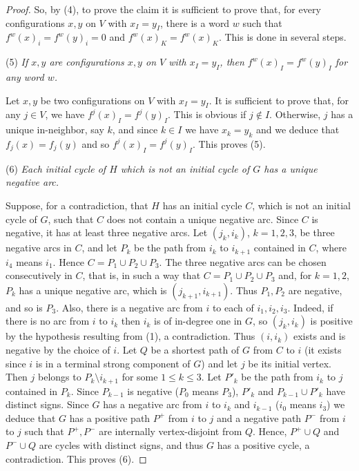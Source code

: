 \documentclass[11pt,letter]{article}
\begin{document}
\begin{proof}
\bigskip
So, by (4), to prove the claim it is sufficient to prove that, for every configurations $x,y$ on $V$ with $x_I=y_I$, there is a word $w$ such that $f^w(x)_i=f^w(y)_i=0$ and $f^w(x)_K=f^w(x)_K$. This is done in several steps. 

\bigskip
\noindent
(5) {\em If $x,y$ are configurations $x,y$ on $V$ with $x_I=y_I$, then $f^w(x)_I=f^w(y)_I$ for any word $w$.}

\medskip
\noindent
Let $x,y$ be two configurations on $V$ with $x_I=y_I$. It is sufficient to prove that, for any $j\in V$, we have $f^j(x)_I=f^j(y)_I$. This is obvious if $j\not\in I$. Otherwise, $j$ has a unique in-neighbor, say $k$, and since $k\in I$ we have $x_k=y_k$ and we deduce that $f_j(x)=f_j(y)$ and so $f^j(x)_I=f^j(y)_I$. This proves (5). 

\bigskip
\noindent
(6) {\em Each initial cycle of $H$ which is not an initial cycle of $G$ has a unique negative arc.}

\medskip
\noindent
Suppose, for a contradiction, that $H$ has an initial cycle $C$, which is not an initial cycle of $G$, such that $C$ does not contain a unique negative arc. Since $C$ is negative, it has at least three negative arcs. Let $(j_k,i_k)$, $k=1,2,3$, be three negative arcs in $C$, and let $P_k$ be the path from $i_k$ to $i_{k+1}$ contained in $C$, where $i_4$ means $i_1$. Hence $C=P_1\cup P_2\cup P_3$. The three negative arcs can be chosen consecutively in $C$, that is, in such a way that $C=P_1\cup P_2\cup P_3$ and, for $k=1,2$, $P_k$ has a unique negative arc, which is $(j_{k+1},i_{k+1})$. Thus $P_1,P_2$ are negative, and so is $P_3$. Also, there is a negative arc from $i$ to each of $i_1,i_2,i_3$. Indeed, if there is no arc from $i$ to $i_k$ then $i_k$ is of in-degree one in $G$, so $(j_k,i_k)$ is positive by the hypothesis resulting from (1), a contradiction. Thus $(i,i_k)$ exists and is negative by the choice of $i$. Let $Q$ be a shortest path of $G$ from $C$ to $i$ (it exists since $i$ is in a terminal strong component of $G$) and let $j$ be its initial vertex. Then $j$ belongs to $P_k\setminus i_{k+1}$ for some $1\leq k\leq 3$. Let $P'_k$ be the path from $i_k$ to $j$ contained in $P_k$. Since $P_{k-1}$ is negative ($P_0$ means $P_3$), $P'_k$ and $P_{k-1}\cup P'_k$ have distinct signs. Since $G$ has a negative arc from $i$ to $i_k$ and $i_{k-1}$ ($i_0$ means $i_3$) we deduce that $G$ has a positive path $P^+$ from $i$ to $j$ and a negative path $P^-$ from $i$ to $j$ such that $P^+,P^-$ are internally vertex-disjoint from $Q$. Hence, $P^+\cup Q$ and $P^-\cup Q$ are cycles with distinct signs, and thus $G$ has a positive cycle, a contradiction. This proves (6).


\end{proof}
\end{document}

